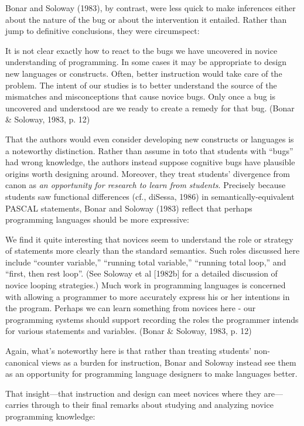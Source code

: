 Bonar and Soloway (1983), by contrast, were less quick to make
inferences either about the nature of the bug or about the intervention
it entailed. Rather than jump to definitive conclusions, they were
circumspect:

It is not clear exactly how to react to the bugs we have uncovered in
novice understanding of programming. In some cases it may be appropriate
to design new languages or constructs. Often, better instruction would
take care of the problem. The intent of our studies is to better
understand the source of the mismatches and misconceptions that cause
novice bugs. Only once a bug is uncovered and understood are we ready to
create a remedy for that bug. (Bonar \& Soloway, 1983, p. 12)

That the authors would even consider developing new constructs or
languages is a noteworthy distinction. Rather than assume in toto that
students with ``bugs'' had wrong knowledge, the authors instead suppose
cognitive bugs have plausible origins worth designing around. Moreover,
they treat students' divergence from canon as \emph{an opportunity for
research to learn from students}. Precisely because students saw
functional differences (cf., diSessa, 1986) in semantically-equivalent
PASCAL statements, Bonar and Soloway (1983) reflect that perhaps
programming languages should be more expressive:

We find it quite interesting that novices seem to understand the role or
strategy of statements more clearly than the standard semantics. Such
roles discussed here include ``counter variable,'' ``running total
variable,'' ``running total loop,'' and ``first, then rest loop''. (See
Soloway et al {[}1982b{]} for a detailed discussion of novice looping
strategies.) Much work in programming languages is concerned with
allowing a programmer to more accurately express his or her intentions
in the program. Perhaps we can learn something from novices here - our
programming systems should support recording the roles the programmer
intends for various statements and variables. (Bonar \& Soloway, 1983,
p. 12)

Again, what's noteworthy here is that rather than treating students'
non-canonical views as a burden for instruction, Bonar and Soloway
instead see them as an opportunity for programming language designers to
make languages better.

That insight---that instruction and design can meet novices where they
are---carries through to their final remarks about studying and
analyzing novice programming knowledge:

